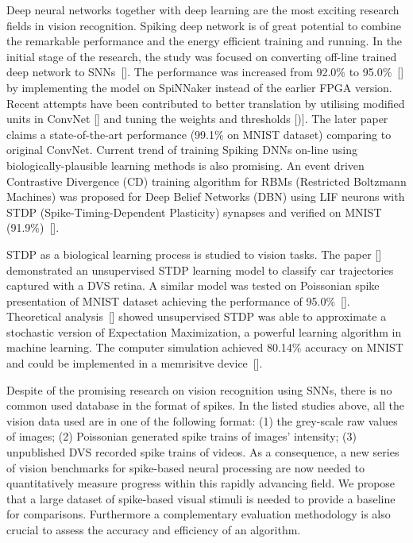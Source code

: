 Deep neural networks together with deep learning are the most exciting research fields in vision recognition.
Spiking deep network is of great potential to combine the remarkable performance and the energy efficient training and running.
In the initial stage of the research, the study was focused on converting off-line trained deep network to SNNs~[\cite{o2013real}].
The performance was increased from 92.0\% to 95.0\%~[\cite{Stromatias2015scalable}] by implementing the model on SpiNNaker instead of the earlier FPGA version.
Recent attempts have been contributed to better translation by utilising modified units in ConvNet [\cite{cao2015spiking}] and tuning the weights and thresholds [\cite{Diehl2015fast})].
The later paper claims a state-of-the-art performance (99.1\% on MNIST dataset) comparing to original ConvNet.
Current trend of training Spiking DNNs on-line using biologically-plausible learning methods is also promising.
An event driven Contrastive Divergence (CD) training algorithm for RBMs (Restricted Boltzmann Machines) was proposed for Deep Belief Networks (DBN) using LIF neurons with STDP (Spike-Timing-Dependent Plasticity) synapses and verified on MNIST (91.9\%)~[\cite{neftci2013event}].

STDP as a biological learning process is studied to vision tasks.
The paper [\cite{bichler2012extraction}] demonstrated an unsupervised STDP learning model to classify car trajectories captured with a DVS retina. 
A similar model was tested on Poissonian spike presentation of MNIST dataset achieving the performance of 95.0\%~[\cite{Diehl2015unsupervised}].
Theoretical analysis~[\cite{nessler2013bayesian}] showed unsupervised STDP was able to approximate a stochastic version of Expectation Maximization, a powerful learning algorithm in machine learning.
The computer simulation achieved 80.14\% accuracy on MNIST and could be implemented in a memrisitve device~[\cite{bill2014compound}]. 

Despite of the promising research on vision recognition using SNNs, there is no common used database in the format of spikes.
In the listed studies above, all the vision data used are in one of the following format:
(1) the grey-scale raw values of images;
(2) Poissonian generated spike trains of images' intensity;
(3) unpublished DVS recorded spike trains of videos.
As a consequence, a new series of vision benchmarks for spike-based neural processing are now needed to quantitatively measure progress within this rapidly advancing field.
We propose that a large dataset of spike-based visual stimuli is needed to provide a baseline for comparisons.
Furthermore a complementary evaluation methodology is also crucial to assess the accuracy and efficiency of an algorithm.

